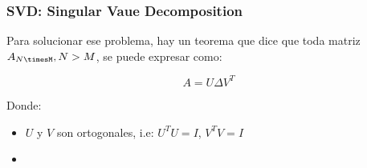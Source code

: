 \documentclass[a4paper,10pt]{article}
\begin{document}
\subsubsection{SVD: Singular Vaue Decomposition}
 Para solucionar ese problema, hay un teorema que dice que toda matriz $A_{N\timesM}, N > M$, se puede expresar como:

 \begin{equation*}
   A = U\Delta V^T
 \end{equation*}

 Donde:

 \begin{itemize}
   \item $U$ y $V$ son ortogonales, i.e: $U^TU = I$, $V^TV = I$
   \item 
 \end{itemize}
\end{document}
